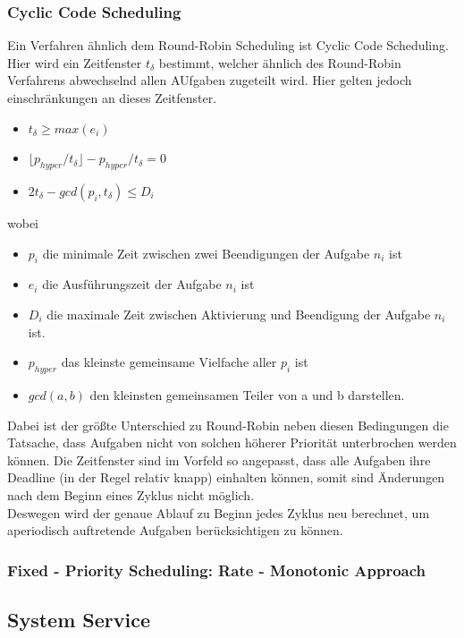 \subsubsection{Cyclic Code Scheduling}
Ein Verfahren ähnlich dem Round-Robin Scheduling ist Cyclic Code Scheduling. Hier wird ein Zeitfenster $t_\delta$ bestimmt, welcher ähnlich des Round-Robin Verfahrens abwechselnd allen AUfgaben zugeteilt wird. Hier gelten jedoch einschränkungen an dieses Zeitfenster.
\begin{itemize}
\item $t_\delta \geq max (e_i)$
\item $\lfloor p_{hyper} / t_\delta\rfloor - p_{hyper} / t_\delta = 0$
\item $2 t_\delta - gcd(p_i, t_\delta) \leq D_i$
\end{itemize}
wobei
\begin{itemize}
\item $p_i$ die minimale Zeit zwischen zwei Beendigungen der Aufgabe $n_i$ ist
\item $e_i$ die Ausführungszeit der Aufgabe $n_i$ ist
\item $D_i$ die maximale Zeit zwischen Aktivierung und Beendigung der Aufgabe $n_i$ ist.
\item $p_{hyper}$ das kleinste gemeinsame Vielfache aller $p_i$ ist
\item $gcd(a,b)$ den kleinsten gemeinsamen Teiler von a und b darstellen.
\end{itemize}
Dabei ist der größte Unterschied zu Round-Robin neben diesen Bedingungen die Tatsache, dass Aufgaben nicht von solchen höherer Priorität unterbrochen werden können. Die Zeitfenster sind im Vorfeld so angepasst, dass alle Aufgaben ihre Deadline (in der Regel relativ knapp) einhalten können, somit sind Änderungen nach dem Beginn eines Zyklus nicht möglich.\\
Deswegen wird der genaue Ablauf zu Beginn jedes Zyklus neu berechnet, um aperiodisch auftretende Aufgaben berücksichtigen zu können.

\subsubsection{Fixed - Priority Scheduling: Rate - Monotonic Approach}

\begin{definition}{}
\end{definition}
\subsection{System Service}\label{2.8}